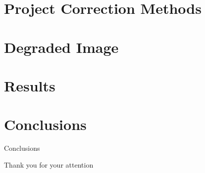 \documentclass[11pt]{beamer}
\begin{document}
\section{Project Correction Methods}




\section{Degraded Image}


\section{Results}


\section{Conclusions}
\begin{frame}{Conclusions}
\end{frame}

\begin{frame}
  \centering
  {\Huge Thank you for your attention}
\end{frame}
\end{document}
